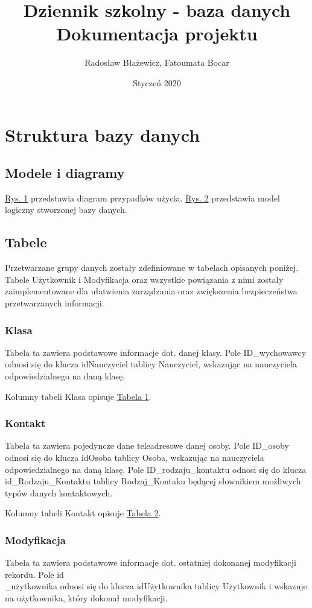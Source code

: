\documentclass[10pt,a4paper,notitlepage]{article}
\author{Radosław Błażewicz, Fatoumata Bocar}
\title{Dziennik szkolny - baza danych\\		
		\Large
		Dokumentacja projektu\\
		}
\date{Styczeń 2020}
\begin{document}
\maketitle

\tableofcontents

\section{Struktura bazy danych}


\subsection{Modele i diagramy}\hyperref[fig1]{Rys. 1} przedstawia diagram przypadków użycia. \hyperref[fig2]{Rys. 2} przedstawia model logiczny stworzonej bazy danych.



\subsection{Tabele}
Przetwarzane grupy danych zostały zdefiniowane w tabelach opisanych poniżej. Tabele Użytkownik i Modyfikacja oraz wszystkie powiązania z nimi zostały zaimplementowane dla ułatwienia zarządzania oraz zwiększenia bezpieczeństwa przetwarzanych informacji.


\subsubsection{Klasa}
Tabela ta zawiera podstawowe informacje dot. danej klasy. Pole ID\_wychowawcy odnosi się do klucza idNauczyciel tablicy Nauczyciel, wskazując na nauczyciela odpowiedzialnego na daną klasę.

Kolumny tabeli Klasa opisuje \hyperref[tab1]{Tabela 1}.



\subsubsection{Kontakt}
Tabela ta zawiera pojedyncze dane teleadresowe danej osoby. Pole ID\_osoby odnosi się do klucza idOsoba tablicy Osoba, wskazując na nauczyciela odpowiedzialnego na daną klasę. Pole ID\_rodzaju\_kontaktu odnosi się do klucza id\_Rodzaju\_Kontaktu tablicy Rodzaj\_Kontaku będącej słownikiem możliwych typów danych kontaktowych.

Kolumny tabeli Kontakt opisuje \hyperref[tab2]{Tabela 2}.


\subsubsection{Modyfikacja}
Tabela ta zawiera podstawowe informacje dot. ostatniej dokonanej modyfikacji rekordu. Pole id\\\_użytkownika odnosi się do klucza idUżytkownika tablicy Użytkownik i wskazuje na użytkownika, który dokonał modyfikacji.
\end{document}
